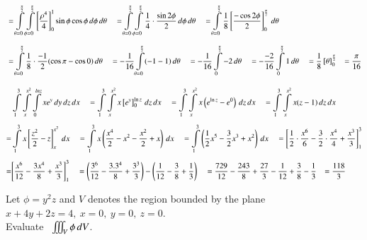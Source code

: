 \documentclass[11pt]{extarticle}
\newcommand{\dx}{{\,dx}}
\newcommand{\dy}{{\,dy}}
\newcommand{\dz}{{\,dz}}
\newcommand{\dtheta}{{\,d\theta}}
\newcommand{\dphi}{{\,d\phi}}
\newcommand{\mint}{\int\displaylimits}
\newcommand{\miiint}{\iiint\displaylimits}
\begin{document}
\vspace{2ex}
$\begin{aligned}
& =\mint_{\theta=0}^{\frac{\pi}{2}} \mint_{\phi=0}^{\frac{\pi}{2}}\left[\frac{\rho^4}{4}\right]_0^1 \sin \phi \cos \phi \dphi \dtheta \quad 
= \mint_{\theta=0}^{\frac{\pi}{2}} \mint_{\phi=0}^{\frac{\pi}{2}} \frac{1}{4} \cdot \frac{\sin 2 \phi}{2} \dphi \dtheta \quad
= \mint_{\theta=0}^{\frac{\pi}{2}} \frac{1}{8}\left[\frac{-\cos 2 \phi}{2}\right]_0^{\frac{\pi}{2}} \dtheta \\[1.5ex] 
& = \mint_{\theta=0}^{\frac{\pi}{2}} \frac{1}{8} \cdot \frac{-1}{2}(\cos \pi-\cos 0)\dtheta  \quad
= -\frac{1}{16} \mint_{\theta=0}^{\frac{\pi}{2}}(-1-1)\dtheta
\quad =-\frac{1}{16} \mint_0^{\frac{\pi}{2}} -2 \dtheta
\quad =-\frac{-2}{16} \mint_0^{\frac{\pi}{2}} 1\dtheta 
\quad =\frac{1}{8}\left[\theta\right]_0^{\frac{\pi}{2}}
\tab =\frac{\pi}{16}
\end{aligned}$

\vspace{2ex}

$\begin{aligned}
& \mint_1^{3} \mint_x^{x^2} \mint_0^{lnz} x e^y \dy\dz\dx
\quad = \mint_1^3 \mint_x^{x^2} x\left[e^y\right]_0^{\ln z} \dz\dx
\quad = \mint_1^3 \mint_x^{x^2} x\left(e^{\ln z}-e^0\right) \dz\dx
\quad = \mint_1^3 \mint_x^{x^2} x(z-1) \dz\dx\\[1ex]
= & \mint_1^3 x\left[\frac{z^2}{2}-z\right]_x^{x^2} \dx
\quad = \mint_1^3 x\left(\frac{x^4}{2}-x^2-\frac{x^2}{2}+x\right) \dx
\quad = \mint_1^3\left(\frac{1}{2} x^5-\frac{3}{2} x^3+x^2\right) \dx
\quad = {\left[\frac{1}{2} \cdot \frac{x^6}{6}-\frac{3}{2} \cdot \frac{x^4}{4}+\frac{x^3}{3}\right]_1^3 } \\[1ex]
= & {\left[\frac{x^6}{12}-\frac{3 x^4}{8}+\frac{x^3}{3}\right]_1^3 }
\quad = \left(\frac{3^6}{12}-\frac{3.3^4}{8}+\frac{3^3}{3}\right) - \left(\frac{1}{12}-\frac{3}{8}+\frac{1}{3}\right)
\quad = \frac{729}{12}-\frac{243}{8}+\frac{27}{3}-\frac{1}{12}+\frac{3}{8}-\frac{1}{3}
\tab = \frac{118}{3}
\end{aligned}$

\pagebreak
\textbf{} Let $\phi=y^2z$ and $V$ denotes the region bounded by the plane $x+4y+2z=4, \ x=0, \ y=0, \ z=0$.\\ Evaluate \ $\miiint_V \phi \,dV$.
\end{document}
